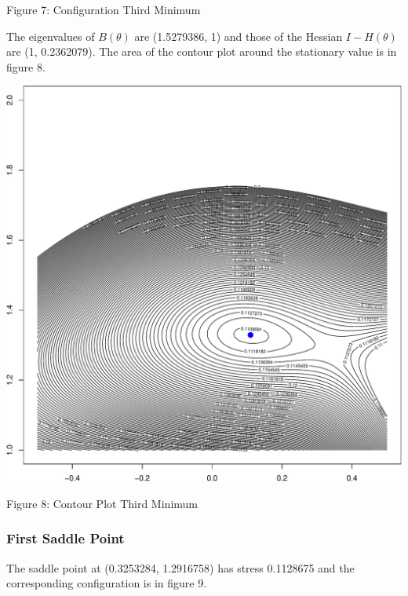 \documentclass[
  12pt,
]{article}
\begin{document}
Figure 7: Configuration Third Minimum

The eigenvalues of \(B(\theta)\) are (1.5279386, 1) and those of the Hessian \(I-H(\theta)\) are
(1, 0.2362079). The area of the contour plot around the stationary value is in figure 8.

\begin{center}\includegraphics{twoPoints_files/figure-latex/contour_third_minimum-1} \end{center}

Figure 8: Contour Plot Third Minimum

\subsubsection{First Saddle Point}\label{first-saddle-point}

The saddle point at (0.3253284, 1.2916758) has stress 0.1128675 and the corresponding configuration is in figure 9.
\end{document}
